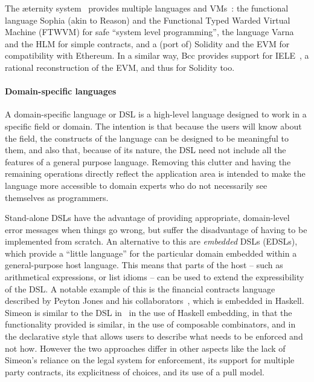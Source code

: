 \documentclass[runningheads]{llncs}
\begin{document}
The \ae{}ternity system~\cite{aeternity} provides multiple languages and VMs~\cite{Stenman-CODE-BEAM}: the functional 
language  Sophia (akin to Reason) and the Functional Typed Warded Virtual Machine (FTWVM) for safe ``system level 
programming'', the language Varna and the HLM for simple contracts, and a (port of) Solidity and the EVM for 
compatibility with Ethereum. In a similar way, Bcc provides support for IELE~\cite{IELE}, a rational reconstruction 
of the EVM, and thus for Solidity too. 

\paragraph{Domain-specific languages} 

A domain-specific language or DSL is a high-level language designed to work in a specific field or domain. The intention 
is that because the users will know about the field, the constructs of the language can be designed to be meaningful to 
them, and also that, because of its nature, the DSL need not include all the features of a general purpose language. 
Removing this clutter and having the remaining operations directly reflect the application area is intended to make the 
language more accessible to domain experts who do not necessarily see themselves as programmers.

Stand-alone DSLs have the advantage of providing appropriate, domain-level error messages when things go wrong, but 
suffer the disadvantage of having to be implemented from scratch. An alternative to this are \emph{embedded} DSLs 
(EDSLs), which provide a ``little language'' for the particular domain embedded within a general-purpose host language. 
This means that parts of the host -- such as arithmetical expressions, or list idioms --  can be used to extend the 
expressibility of the DSL. A notable example of this is the financial contracts language described by Peyton Jones and 
his collaborators~\cite{PeytonJones:2000}, which is embedded in Haskell. Simeon is similar to the 
DSL in~\cite{PeytonJones:2000} in the use of Haskell embedding, in that the functionality provided is similar, in the use of 
composable combinators, and in the declarative style that allows users to describe what needs to be enforced and not how. 
However the two approaches differ in other aspects like the lack of Simeon's reliance on the legal system for 
enforcement, its support for multiple party contracts, its explicitness of choices, and its use of a pull model.
\end{document}
